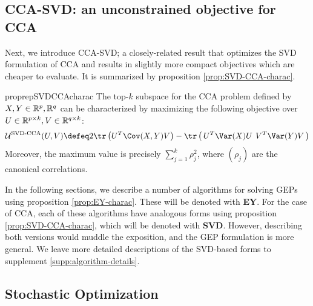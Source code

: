 \subsection{CCA-SVD: an unconstrained objective for CCA}\label{sec:gep-ey-formulation}
Next, we introduce CCA-SVD; a closely-related result that optimizes the SVD formulation of CCA and results in slightly more compact objectives which are cheaper to evaluate. It is summarized by proposition \ref{prop:SVD-CCA-charac}.

\begin{restatable}{proprep}{SVDCCAcharac}
\label{prop:SVD-CCA-charac}
    The top-$k$ subspace for the CCA problem defined by $X,Y \in \mathbb{R}^p,\mathbb{R}^q$ can be characterized by maximizing the following objective over $U \in \mathbb{R}^{p \times k}, V \in \mathbb{R}^{q \times k}$:
    \begin{align}\label{eq:EY-charac}
        \mathcal{U}^\text{SVD-CCA}(U,V) 
        \defeq 2 \tr\left({U}^T \Cov(X,Y) {V} \right) - \tr\left(\, {U}^T \Var(X) {U} \:\, {V}^T \Var(Y) {V} \,\right)
    \end{align}
    Moreover, the maximum value is precisely $\sum_{j=1}^k \rho_j^2$, where $(\rho_j)$ are the canonical correlations.
\end{restatable}

In the following sections, we describe a number of algorithms for solving GEPs using proposition \ref{prop:EY-charac}.
These will be denoted with \textbf{EY}. For the case of CCA, each of these algorithms have analogous forms using proposition \ref{prop:SVD-CCA-charac}, which will be denoted with \textbf{SVD}. However, describing both versions would muddle the exposition, and the GEP formulation is more general. We leave more detailed descriptions of the SVD-based forms to supplement \ref{supp:algorithm-details}.

\subsection{Stochastic Optimization}

